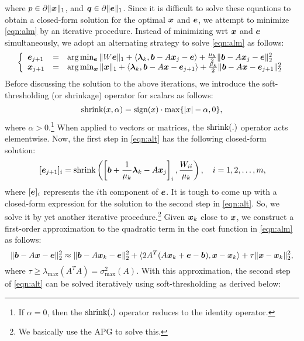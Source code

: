 where ${p} \in \partial \|{\boldsymbol{x}}\|_1$, and ${\boldsymbol q} \in \partial \|\boldsymbol{e}\|_1$. Since it is difficult to solve these equations to obtain a closed-form solution for the optimal ${\boldsymbol{x}}$ and $\boldsymbol{e}$, we attempt to minimize \eqref{eqn:alm} by an iterative procedure. 
\smallbreak
Instead of minimizing wrt ${\boldsymbol{x}}$ and $\boldsymbol{e}$ simultaneously, we adopt an alternating strategy to solve \eqref{eqn:alm} as follows:
\begin{equation}
\left \{
\begin{array}{lll}
\boldsymbol{e}_{j+1} & = & \arg \min_{\boldsymbol{e}}  \|W\boldsymbol{e}\|_1 + \langle \boldsymbol{\lambda}_k, \boldsymbol{b} - A{\boldsymbol{x}}_j - \boldsymbol{e} \rangle + \frac{\mu_k}{2}\|\boldsymbol{b} - A{\boldsymbol{x}}_j - \boldsymbol{e}\|_2^2 \\
{\boldsymbol{x}}_{j+1} & = & \arg \min_{{\boldsymbol{x}}} \|{\boldsymbol{x}}\|_1 + \langle \boldsymbol{\lambda}_k, \boldsymbol{b} - A{\boldsymbol{x}} - \boldsymbol{e}_{j+1} \rangle + \frac{\mu_k}{2}\|\boldsymbol{b} - A{\boldsymbol{x}} - \boldsymbol{e}_{j+1}\|_2^2
\end{array}
\right .
\label{eqn:alt}
\end{equation}
Before discussing the solution to the above iterations, we introduce the soft-thresholding (or shrinkage) operator for scalars as follows:
\begin{equation}
{\text{shrink}}(x,\alpha) = {\text{sign}}(x)\cdot \max\{|x| - \alpha, 0\},
\end{equation}
where $\alpha > 0$.\footnote{If $\alpha = 0$, then the ${\text{shrink}}(.)$ operator reduces to the identity operator.} When applied to vectors or matrices, the ${\text{shrink}}(.)$ operator acts elementwise. 
\smallbreak
Now, the first step in \eqref{eqn:alt} has the following closed-form solution:
\begin{equation}
\,[\boldsymbol{e}_{j+1}]_i  =  {\text{shrink}} \left(\left[ \boldsymbol{b} + \frac{1}{\mu_k}\boldsymbol{\lambda}_k - A{\boldsymbol{x}}_j \right] _i, \frac{W_{ii}}{\mu_k}\right), \quad i = 1,2,\ldots,m,
\end{equation}
where $[\boldsymbol{e}]_i$ represents the $i$th component of $\boldsymbol{e}$.
\smallbreak
It is tough to come up with a closed-form expression for the solution to the second step in \eqref{eqn:alt}. So, we solve it by yet another iterative procedure.\footnote{We basically use the APG to solve this.} Given ${\boldsymbol{x}}_k$ close to ${\boldsymbol{x}}$, we construct a first-order approximation to the quadratic term in the cost function in \eqref{eqn:alm} as follows:
\begin{equation}
\|\boldsymbol{b} - A{\boldsymbol{x}} - \boldsymbol{e}\|_2^2 \approx \|\boldsymbol{b} - A{\boldsymbol{x}}_k - \boldsymbol{e}\|_2^2 + \langle 2A^T(A{\boldsymbol{x}}_k+\boldsymbol{e}-\boldsymbol{b}), {\boldsymbol{x}} - {\boldsymbol{x}}_k \rangle + \tau\|{\boldsymbol{x}}-{\boldsymbol{x}}_k\|_2^2,
\end{equation}
where $\tau \geq \lambda_\mathrm{max} (A^TA) = \sigma^2_\mathrm{max}(A)$. With this approximation, the second step of \eqref{eqn:alt} can be solved iteratively using soft-thresholding as derived below:
